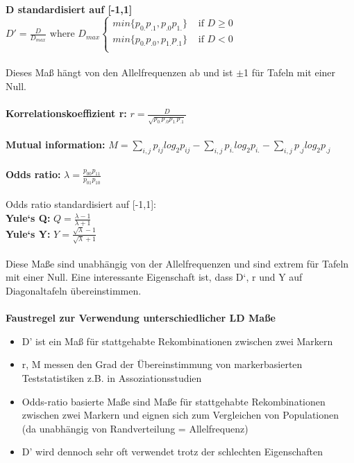 \textbf{D standardisiert auf [-1,1]}\\
$D'=\displaystyle \frac{D}{D_{max}} \text{ where } D_{max}
\begin{cases}
	min\{p_{0.}p_{.1}, p_{.0}p_{1.}\} &\text{ if } D\geq 0 \\
	min\{p_{0.}p_{.0}, p_{1.}p_{.1}\} &\text{ if } D < 0\\
\end{cases}
$
\\\\
Dieses Maß hängt von den Allelfrequenzen ab und ist $\pm$1 für Tafeln mit einer Null.
\\\\
\textbf{Korrelationskoeffizient r:}
$r=\displaystyle \frac{D}{\sqrt{p_{0.}p_{.0}p_{1.}p_{.1}}}$
\\\\
\textbf{Mutual information:} $M = \displaystyle \sum_{i,j} p_{ij} log_2p_{ij} - \sum_{i,j} p_{i.}log_2p_{i.} - \sum_{i,j} p_{.j} log_2 p_{.j}$
\\\\
\textbf{Odds ratio:} $\lambda=\displaystyle \frac{p_{00}p_{11}}{p_{01}p_{10}}$\\\\
Odds ratio standardisiert auf [-1,1]:\\
\textbf{Yule‘s Q:} $Q=\displaystyle \frac{\lambda-1}{\lambda+1}$\\
\textbf{Yule‘s Y:} $Y=\displaystyle \frac{\sqrt{\lambda}-1}{\sqrt{\lambda}+1}$
\\\\
Diese Maße sind unabhängig von der Allelfrequenzen und sind extrem
für Tafeln mit einer Null. Eine interessante Eigenschaft ist, dass D‘, r
und Y auf Diagonaltafeln übereinstimmen.
\\\\
\textbf{Faustregel zur Verwendung unterschiedlicher LD Maße}
\begin{itemize}
	\item D' ist ein Maß für stattgehabte Rekombinationen zwischen zwei Markern
	\item r, M messen den Grad der Übereinstimmung von markerbasierten Teststatistiken z.B. in Assoziationsstudien
	\item Odds-ratio basierte Maße sind Maße für stattgehabte Rekombinationen zwischen zwei Markern und eignen sich zum Vergleichen von Populationen (da unabhängig von Randverteilung = Allelfrequenz)
	\item D' wird dennoch sehr oft verwendet trotz der schlechten Eigenschaften
\end{itemize}

